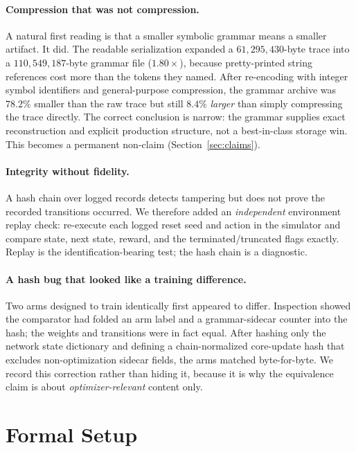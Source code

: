 \documentclass[11pt]{article}
\begin{document}
\paragraph{Compression that was not compression.}
A natural first reading is that a smaller symbolic grammar means a smaller artifact. It did.
The readable serialization expanded a $61{,}295{,}430$-byte trace into a
$110{,}549{,}187$-byte grammar file ($1.80\times$), because pretty-printed string references cost
more than the tokens they named. After re-encoding with integer symbol identifiers and
general-purpose compression, the grammar archive was $78.2\%$ smaller than the raw trace but
still $8.4\%$ \emph{larger} than simply compressing the trace directly. The correct conclusion
is narrow: the grammar supplies exact reconstruction and explicit production structure, not a
best-in-class storage win. This becomes a permanent non-claim (Section~\ref{sec:claims}).

\paragraph{Integrity without fidelity.}
A hash chain over logged records detects tampering but does not prove the recorded transitions
occurred. We therefore added an \emph{independent} environment replay check: re-execute each
logged reset seed and action in the simulator and compare state, next state, reward, and the
terminated/truncated flags exactly. Replay is the identification-bearing test; the hash chain is
a diagnostic.

\paragraph{A hash bug that looked like a training difference.}
Two arms designed to train identically first appeared to differ. Inspection showed the
comparator had folded an arm label and a grammar-sidecar counter into the hash; the weights and
transitions were in fact equal. After hashing only the network state dictionary and defining a
chain-normalized core-update hash that excludes non-optimization sidecar fields, the arms matched
byte-for-byte. We record this correction rather than hiding it, because it is why the equivalence
claim is about \emph{optimizer-relevant} content only.

\section{Formal Setup}
\label{sec:setup}
\end{document}
